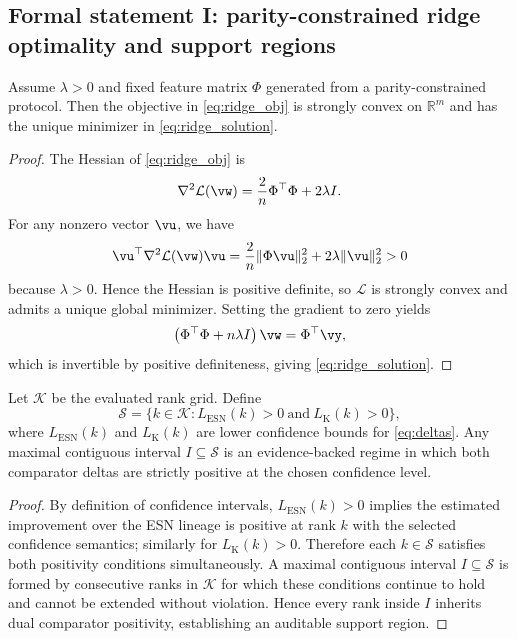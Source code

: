 \subsection{Formal statement I: parity-constrained ridge optimality and support regions}
\begin{lemma}\label{lem:ridge_unique}
Assume $\lambda>0$ and fixed feature matrix $\Phi$ generated from a parity-constrained protocol. Then the objective in \eqref{eq:ridge_obj} is strongly convex on $\mathbb{R}^m$ and has the unique minimizer in \eqref{eq:ridge_solution}.
\end{lemma}
\begin{proof}
The Hessian of \eqref{eq:ridge_obj} is
\[
\nabla^2\mathcal{L}(\vw)=\frac{2}{n}\Phi^\top\Phi+2\lambda I.
\]
For any nonzero vector $\vu$, we have
\[
\vu^\top\nabla^2\mathcal{L}(\vw)\vu=\frac{2}{n}\|\Phi\vu\|_2^2+2\lambda\|\vu\|_2^2>0
\]
because $\lambda>0$. Hence the Hessian is positive definite, so $\mathcal{L}$ is strongly convex and admits a unique global minimizer. Setting the gradient to zero yields
\[
\left(\Phi^\top\Phi+n\lambda I\right)\vw=\Phi^\top\vy,
\]
which is invertible by positive definiteness, giving \eqref{eq:ridge_solution}.\qedhere
\end{proof}

\begin{theorem}\label{thm:contiguous}
Let $\mathcal{K}$ be the evaluated rank grid. Define
\[
\mathcal{S}=\{k\in\mathcal{K}:L_{\text{ESN}}(k)>0\ \text{and}\ L_{\text{K}}(k)>0\},
\]
where $L_{\text{ESN}}(k)$ and $L_{\text{K}}(k)$ are lower confidence bounds for \eqref{eq:deltas}. Any maximal contiguous interval $I\subseteq\mathcal{S}$ is an evidence-backed regime in which both comparator deltas are strictly positive at the chosen confidence level.
\end{theorem}
\begin{proof}
By definition of confidence intervals, $L_{\text{ESN}}(k)>0$ implies the estimated improvement over the ESN lineage is positive at rank $k$ with the selected confidence semantics; similarly for $L_{\text{K}}(k)>0$. Therefore each $k\in\mathcal{S}$ satisfies both positivity conditions simultaneously. A maximal contiguous interval $I\subseteq\mathcal{S}$ is formed by consecutive ranks in $\mathcal{K}$ for which these conditions continue to hold and cannot be extended without violation. Hence every rank inside $I$ inherits dual comparator positivity, establishing an auditable support region.\qedhere
\end{proof}


